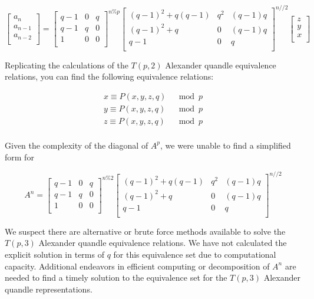 \documentclass[paper.tex]{subfiles}
\begin{document}
\[
\left[ \begin{array}{ccc}
a_{n} \\
a_{n-1} \\
a_{n-2} \\
\end{array} \right]
=
\left[ \begin{array}{ccc}
q-1 & 0 & q \\
q-1 & q & 0 \\
1 & 0 & 0 \\
\end{array} \right] ^{n\%p}
\left[ \begin{array}{ccc}
(q-1)^{2} + q(q-1) & q^{2} & (q-1)q \\
(q-1)^{2} + q & 0 & (q-1)q \\
q-1 & 0 & q \\
\end{array} \right] ^{n//2}
\left[ \begin{array}{ccc}
z \\
y \\
x \\
\end{array} \right]
\]

Replicating the calculations of the $T(p,2)$ Alexander quandle equivalence relations, you can find the following equivalence relations:

\begin{align*}
	x \equiv P(x,y,z,q) & \mod{p} \\
	y \equiv P(x,y,z,q) & \mod{p} \\
	z \equiv P(x,y,z,q) & \mod{p} \\
\end{align*}

Given the complexity of the diagonal of $A^{p}$, we were unable to find a simplified form for

\[ A^{n}
=
\left[ \begin{array}{ccc}
q-1 & 0 & q \\
q-1 & q & 0 \\
1 & 0 & 0 \\
\end{array} \right] ^{n\%2}
\left[ \begin{array}{ccc}
(q-1)^{2} + q(q-1) & q^{2} & (q-1)q \\
(q-1)^{2} + q & 0 & (q-1)q \\
q-1 & 0 & q \\
\end{array} \right] ^{n//2}
\]

We suspect there are alternative or brute force methods available to solve the $T(p,3)$ Alexander quandle equivalence relations.  We have not calculated the explicit solution in terms of $q$ for this equivalence set due to computational capacity. Additional endeavors in efficient computing or decomposition of $A^{n}$ are needed to find a timely solution to the equivalence set for the $T(p,3)$ Alexander quandle representations.
\end{document}

